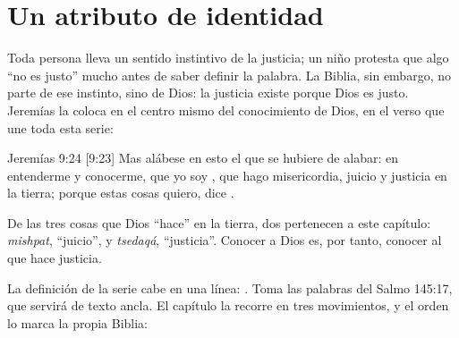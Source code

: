 
\section{Un atributo de identidad}

Toda persona lleva un sentido instintivo de la justicia; un niño protesta que algo ``no es justo'' mucho antes de saber definir la palabra. La Biblia, sin embargo, no parte de ese instinto, sino de Dios: la justicia existe porque Dios es justo. Jeremías la coloca en el centro mismo del conocimiento de Dios, en el verso que une toda esta serie:

\begin{verso}{Jeremías 9:24 [9:23]}
Mas alábese en esto el que se hubiere de alabar: en entenderme y conocerme, que yo soy \SENOR, que hago misericordia, juicio y justicia en la tierra; porque estas cosas quiero, dice \SENOR.
\end{verso}

De las tres cosas que Dios ``hace'' en la tierra, dos pertenecen a este capítulo:  \emph{mishpat}, ``juicio'', y  \emph{tsedaqá}, ``justicia''. Conocer a Dios es, por tanto, conocer al que hace justicia.

La definición de la serie cabe en una línea: . Toma las palabras del Salmo 145:17, que servirá de texto ancla. El capítulo la recorre en tres movimientos, y el orden lo marca la propia Biblia:

